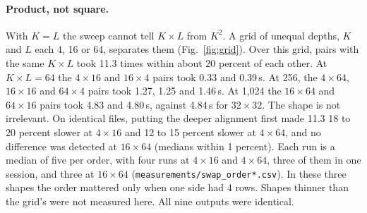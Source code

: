 \documentclass[11pt,letterpaper]{article}
\newcommand{\code}[1]{\texttt{#1}}
\begin{document}
\paragraph{Product, not square.} With $K = L$ the sweep cannot tell $K \times L$ from $K^2$. A grid of unequal depths,
$K$ and $L$ each 4, 16 or 64, separates them (Fig.~\ref{fig:grid}). Over this grid, pairs with the same
$K \times L$ took 11.3 times within about 20 percent of each other. At $K \times L = 64$ the $4 \times 16$ and $16 \times 4$ pairs took 0.33
and 0.39\,s. At 256, the $4 \times 64$, $16 \times 16$ and $64 \times 4$ pairs took 1.27, 1.25 and 1.46\,s. At
1,024 the $16 \times 64$ and $64 \times 16$ pairs took 4.83 and 4.80\,s, against 4.84\,s for $32 \times 32$. The
shape is not irrelevant. On identical files, putting the deeper alignment first made 11.3 18 to 20 percent slower at
$4 \times 16$ and 12 to 15 percent slower at $4 \times 64$, and no difference was detected at $16 \times 64$ (medians within 1 percent). Each run is a median of five
per order, with four runs at $4 \times 16$ and $4 \times 64$, three of them in one session, and three at $16 \times 64$
(\code{measurements/swap\_order*.csv}). In these three shapes the order mattered only when one side had 4 rows. Shapes thinner than the grid's were not measured here. All nine outputs were identical.
\end{document}
